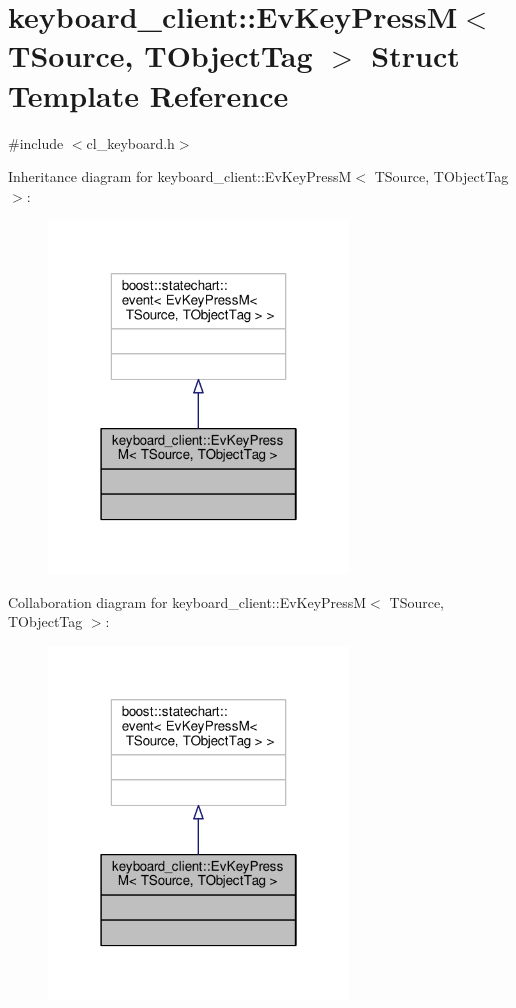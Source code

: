 \hypertarget{structkeyboard__client_1_1EvKeyPressM}{}\section{keyboard\+\_\+client\+:\+:Ev\+Key\+PressM$<$ T\+Source, T\+Object\+Tag $>$ Struct Template Reference}
\label{structkeyboard__client_1_1EvKeyPressM}


{\ttfamily \#include $<$cl\+\_\+keyboard.\+h$>$}



Inheritance diagram for keyboard\+\_\+client\+:\+:Ev\+Key\+PressM$<$ T\+Source, T\+Object\+Tag $>$\+:\nopagebreak
\begin{figure}[H]
\begin{center}
\leavevmode
\includegraphics[width=226pt]{structkeyboard__client_1_1EvKeyPressM__inherit__graph}
\end{center}
\end{figure}


Collaboration diagram for keyboard\+\_\+client\+:\+:Ev\+Key\+PressM$<$ T\+Source, T\+Object\+Tag $>$\+:\nopagebreak
\begin{figure}[H]
\begin{center}
\leavevmode
\includegraphics[width=226pt]{structkeyboard__client_1_1EvKeyPressM__coll__graph}
\end{center}
\end{figure}


